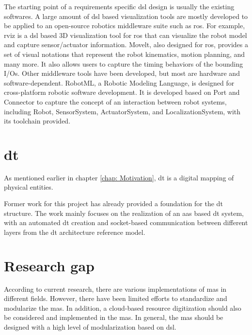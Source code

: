 The starting point of a requirements specific \gls{dsl} design is usually 
the existing softwares. 
A large amount of \gls{dsl} based visualization tools are mostly developed 
to be applied to an open-source robotics middleware suite such as \gls{ros}. 
For example, \gls{rviz} is a \gls{dsl} based 3D 
visualization tool for \gls{ros} that can visualize the robot model and 
capture sensor/actuator information. Movelt, also designed for \gls{ros}, 
provides a set of visual notations that represent the robot kinematics, 
motion planning, and many more. It also allows users to capture the 
timing behaviors of the bounding I/Os. Other middleware tools have been 
developed, but most are hardware and software-dependent. RobotML, a 
Robotic Modeling Language, is designed for cross-platform robotic 
software development\cite{hutchison_robotml_2012}. It is developed 
based on Port and Connector to
capture the concept of an interaction between robot systems, including 
Robot, SensorSystem, ActuatorSystem, and LocalizationSystem, with its toolchain 
provided\cite[fig.5]{hutchison_robotml_2012}.



\section{\gls{dt}}


As mentioned earlier in chapter \ref{chap: Motivation}, 
\gls{dt} is a digital mapping of physical entities. 







Former work for this 
project has already provided a foundation for the \gls{dt} 
structure\cite{hofgen_architecture_2023}. 
The work mainly focuses on the realization of an \gls{aas} based \gls{dt} system, 
with an automated \gls{dt} creation and socket-based communication between 
different layers from the \gls{dt} architecture reference 
model\cite[fig.5]{aheleroff_digital_2021}. 




\section{Research gap}

According to current research, there are various implementations of \gls{mas} in 
different fields. However, there have been limited efforts to standardize and 
modularize the \gls{mas}. In addition, a cloud-based resource digitization should also 
be considered and implemented in the \gls{mas}. In general, the \gls{mas} should be designed 
with a high level of modularization based on \gls{dsl}.

